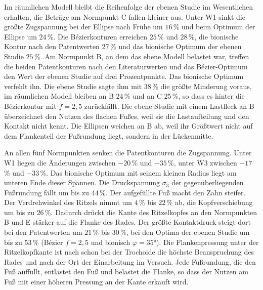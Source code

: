 
Im räumlichen Modell bleibt die Reihenfolge der ebenen Studie im Wesentlichen erhalten, die Beträge am Normpunkt C fallen kleiner aus. Unter W1 sinkt die größte Zugspannung bei der Ellipse nach Frühe um $16$\,\% und beim Optimum der Ellipse um $24$\,\%. Die Bézierkonturen erreichen $25$\,\% und $28$\,\%, die bionische Kontur nach den Patentwerten $27$\,\% und das bionische Optimum der ebenen Studie $25$\,\%. Am Normpunkt B, an dem das ebene Modell belastet war, treffen die beiden Patentkonturen nach den Literaturwerten und das Bézier-Optimum den Wert der ebenen Studie auf drei Prozentpunkte. Das bionische Optimum verfehlt ihn. Die ebene Studie sagte ihm mit $38$\,\% die größte Minderung voraus, im räumlichen Modell bleiben an B $24$\,\% und an C $25$\,\%, so dass es hinter die Bézierkontur mit $f = 2{,}5$ zurückfällt. Die ebene Studie mit einem Lastfleck an B überzeichnet den Nutzen des flachen Fußes, weil sie die Lastaufteilung und den Kontakt nicht kennt. Die Ellipsen weichen an B ab, weil ihr Größtwert nicht auf dem Flankenteil der Fußrundung liegt, sondern in der Lückenmitte.

An allen fünf Normpunkten senken die Patentkonturen die Zugspannung. Unter W1 liegen die Änderungen zwischen $-20$\,\% und $-35$\,\%, unter W3 zwischen $-17$\,\% und $-33$\,\%. Das bionische Optimum mit seinem kleinen Radius liegt am unteren Ende dieser Spannen. Die Druckspannung $\sigma_{\mathrm{3}}$ der gegenüberliegenden Fußrundung fällt um bis zu $44$\,\%. Der aufgefüllte Fuß macht den Zahn steifer. Der Verdrehwinkel des Ritzels nimmt um $4$\,\% bis $22$\,\% ab, die Kopfverschiebung um bis zu $26$\,\%. Dadurch drückt die Kante des Ritzelkopfes an den Normpunkten B und E stärker auf die Flanke des Rades. Der größte Kontaktdruck steigt dort bei den Patentwerten um $21$\,\% bis $30$\,\%, bei den Optima der ebenen Studie um bis zu $53$\,\% (Bézier $f = 2{,}5$ und bionisch $\varphi = 35$°). Die Flankenpressung unter der Ritzelkopfkante ist nach  schon bei der Trochoide die höchste Beanspruchung des Rades und nach  der Ort der Einarbeitung im Versuch. Jede Fußrundung, die den Fuß auffüllt, entlastet den Fuß und belastet die Flanke, so dass der Nutzen am Fuß mit einer höheren Pressung an der Kante erkauft wird.

